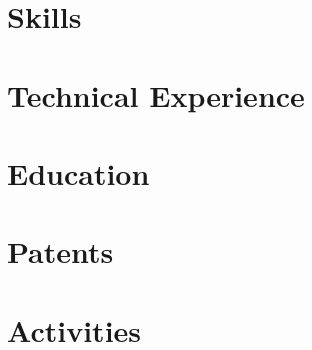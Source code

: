 \documentclass[letter,10pt]{article}
\begin{document}
% 

\section{Skills}


\section{Technical Experience}


\section{Education}


\section{Patents}


\section{Activities}

\end{document}
